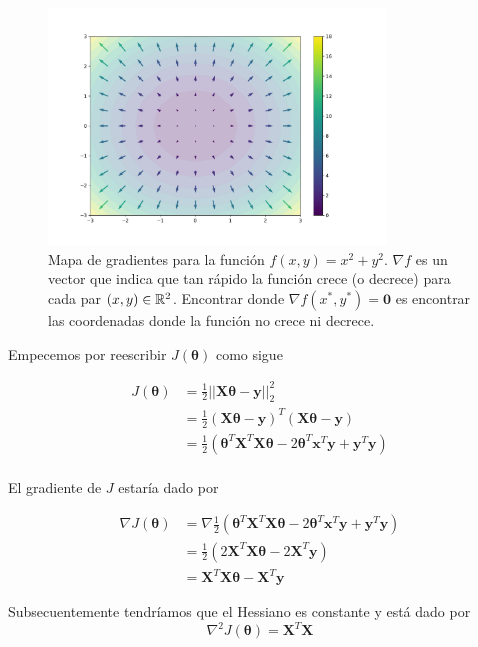 \documentclass[11pt]{article}
\begin{document}
\begin{figure}
	\centering
	\includegraphics[width=0.8\textwidth]{grad}
	\caption{Mapa de gradientes para la función $f(x, y) = x^2 + y^2$. $\nabla f$ es un vector que indica que tan rápido la función crece (o decrece) para cada par $(x,y) \in\mathbb{R}^2$. Encontrar donde $\nabla f(x^*, y^*) = \bm{0}$ es encontrar las coordenadas donde la función no crece ni decrece.}
\end{figure}

Empecemos por reescribir $J(\bm\theta)$ como sigue

 \begin{align}
   J(\bm\theta) &= \frac{1}{2}||\bm{X}\bm{\theta} - \bm{y}||_2^2\\
             &= \frac{1}{2}(\bm{X}\bm{\theta} - \bm{y})^T(\bm{X}\bm{\theta} - \bm{y})\\
             &= \frac{1}{2}\left(\bm{\theta}^T\bm{X}^T\bm{X}\bm{\theta} - 2\bm{\theta}^T\bm{x}^T\bm{y} + \bm{y}^T\bm{y}\right)\\
\end{align}

El gradiente de $J$ estaría dado por

\begin{align}
	\nabla J(\bm\theta) &= \nabla\frac{1}{2}\left(\bm{\theta}^T\bm{X}^T\bm{X}\bm{\theta} - 2\bm{\theta}^T\bm{x}^T\bm{y} + \bm{y}^T\bm{y}\right)\\
	&= \frac{1}{2}\left(2\bm{X}^T\bm{X}\bm{\theta} - 2 \bm{X}^T\bm{y}\right)\\
	&= \bm{X}^T\bm{X}\bm{\theta} - \bm{X}^T\bm{y}
\end{align}

Subsecuentemente tendríamos que el Hessiano es constante y está dado por
\begin{equation}
	\nabla^2 J(\bm\theta) = \bm{X}^T\bm{X}
\end{equation}
\end{document}
